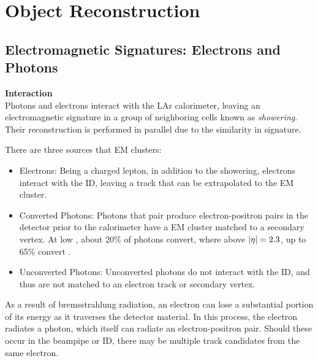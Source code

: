 \section{Object Reconstruction} \label{sec:reconstruction}

\subsection{Electromagnetic Signatures: Electrons and Photons} \label{ssec:em-signatures} %

\noindent\textbf{Interaction}\\
\indent Photons and electrons interact with the \gls{LAr} calorimeter, leaving an electromagnetic signature in a group of neighboring cells known as \textit{showering}. Their reconstruction is performed in parallel due to the similarity in signature.

There are three sources that \gls{EM} clusters:
\begin{itemize}
    \item Electrons: Being a charged lepton, in addition to the showering, electrons interact with the \gls{ID}, leaving a track that can be extrapolated to the \gls{EM} cluster.
    \item Converted Photons: Photons that pair produce electron-positron pairs in the detector prior to the calorimeter have a \gls{EM} cluster matched to a secondary vertex. At low \abseta, about 20\% of photons convert, where above $|\eta|=2.3$, up to 65\% convert \cite{photon-electron-perf}.
    \item Unconverted Photons: Unconverted photons do not interact with the \gls{ID}, and thus are not matched to an electron track or secondary vertex.
\end{itemize}

As a result of bremsstrahlung radiation, an electron can lose a substantial portion of its energy as it traverses the detector material. In this process, the electron radiates a photon, which itself can radiate an electron-positron pair. Should these occur in the beampipe or \gls{ID}, there may be multiple track candidates from the same electron.


